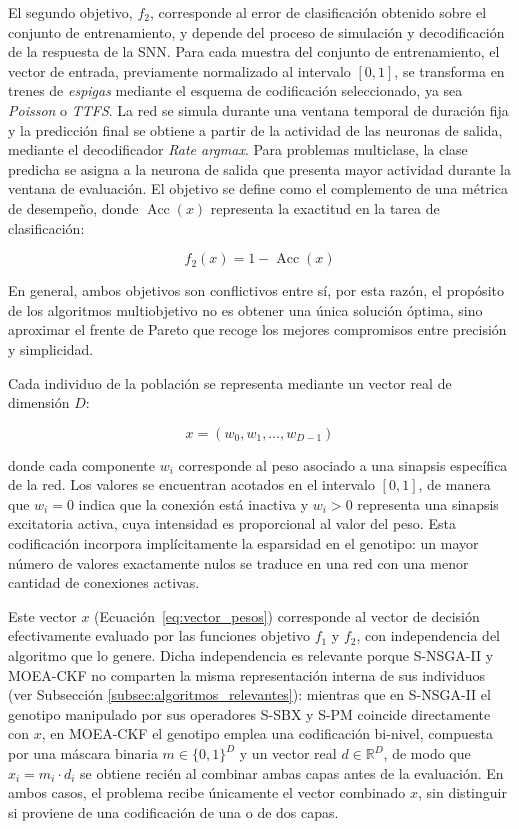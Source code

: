 El segundo objetivo, $f_2$, corresponde al error de clasificación obtenido sobre el conjunto de entrenamiento, y depende del proceso de simulación y decodificación de la respuesta de la SNN. Para cada muestra del conjunto de entrenamiento, el vector de entrada, previamente normalizado al intervalo $[0,1]$, se transforma en trenes de \textit{espigas} mediante el esquema de codificación seleccionado, ya sea \textit{Poisson} o \textit{TTFS}. La red se simula durante una ventana temporal de duración fija y la predicción final se obtiene a partir de la actividad de las neuronas de salida, mediante el decodificador \textit{Rate argmax}. Para problemas multiclase, la clase predicha se asigna a la neurona de salida que presenta mayor actividad durante la ventana de evaluación. El objetivo se define como el complemento de una métrica de desempeño, donde $\operatorname{Acc}(x)$ representa la exactitud en la tarea de clasificación:

\begin{equation}
f_2(x) =
1 - \operatorname{Acc}(x)
\label{eq:classification_error}
\end{equation}

En general, ambos objetivos son conflictivos entre sí, por esta razón, el propósito de los algoritmos multiobjetivo no es obtener una única solución óptima, sino aproximar el frente de Pareto que recoge los mejores compromisos entre precisión y simplicidad.

Cada individuo de la población se representa mediante un vector real de dimensión $D$:

\begin{equation}
x = (w_0,w_1,\ldots,w_{D-1})
\label{eq:vector_pesos}
\end{equation}

donde cada componente $w_i$ corresponde al peso asociado a una sinapsis específica de la red. Los valores se encuentran acotados en el intervalo $[0,1]$, de manera que $w_i = 0$ indica que la conexión está inactiva y $w_i > 0$ representa una sinapsis excitatoria activa, cuya intensidad es proporcional al valor del peso. Esta codificación incorpora implícitamente la esparsidad en el genotipo: un mayor número de valores exactamente nulos se traduce en una red con una menor cantidad de conexiones activas.

Este vector $x$ (Ecuación~\ref{eq:vector_pesos}) corresponde al vector de decisión efectivamente evaluado por las funciones objetivo $f_1$ y $f_2$, con independencia del algoritmo que lo genere. Dicha independencia es relevante porque S-NSGA-II y MOEA-CKF no comparten la misma representación interna de sus individuos (ver Subsección \ref{subsec:algoritmos_relevantes}): mientras que en S-NSGA-II el genotipo manipulado por sus operadores S-SBX y S-PM coincide directamente con $x$, en MOEA-CKF el genotipo emplea una codificación bi-nivel, compuesta por una máscara binaria $m \in \{0,1\}^D$ y un vector real $d \in \mathbb{R}^D$, de modo que $x_i = m_i \cdot d_i$ se obtiene recién al combinar ambas capas antes de la evaluación. En ambos casos, el problema recibe únicamente el vector combinado $x$, sin distinguir si proviene de una codificación de una o de dos capas.

